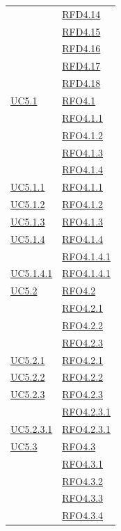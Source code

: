 \begin{longtable}{|>{\centering}m{5cm}|m{5cm}<{\centering}|}
& \hyperlink{RFD4.14}{RFD4.14}\\
& \hyperlink{RFD4.15}{RFD4.15}\\
& \hyperlink{RFD4.16}{RFD4.16}\\
& \hyperlink{RFD4.17}{RFD4.17}\\
& \hyperlink{RFD4.18}{RFD4.18}\\ \hline
\hyperref[UC5.1]{UC5.1} & \hyperlink{RFO4.1}{RFO4.1}\\
& \hyperlink{RFO4.1.1}{RFO4.1.1}\\
& \hyperlink{RFO4.1.2}{RFO4.1.2}\\
& \hyperlink{RFO4.1.3}{RFO4.1.3}\\
& \hyperlink{RFO4.1.4}{RFO4.1.4}\\ \hline
\hyperref[UC5.1.1]{UC5.1.1} & \hyperlink{RFO4.1.1}{RFO4.1.1}\\ \hline
\hyperref[UC5.1.2]{UC5.1.2} & \hyperlink{RFO4.1.2}{RFO4.1.2}\\ \hline
\hyperref[UC5.1.3]{UC5.1.3} & \hyperlink{RFO4.1.3}{RFO4.1.3}\\ \hline
\hyperref[UC5.1.4]{UC5.1.4} & \hyperlink{RFO4.1.4}{RFO4.1.4}\\
& \hyperlink{RFO4.1.4.1}{RFO4.1.4.1}\\ \hline
\hyperref[UC5.1.4.1]{UC5.1.4.1} & \hyperlink{RFO4.1.4.1}{RFO4.1.4.1}\\ \hline
\hyperref[UC5.2]{UC5.2} & \hyperlink{RFO4.2}{RFO4.2}\\
& \hyperlink{RFO4.2.1}{RFO4.2.1}\\
& \hyperlink{RFO4.2.2}{RFO4.2.2}\\
& \hyperlink{RFO4.2.3}{RFO4.2.3}\\ \hline
\hyperref[UC5.2.1]{UC5.2.1} & \hyperlink{RFO4.2.1}{RFO4.2.1}\\ \hline
\hyperref[UC5.2.2]{UC5.2.2} & \hyperlink{RFO4.2.2}{RFO4.2.2}\\ \hline
\hyperref[UC5.2.3]{UC5.2.3} & \hyperlink{RFO4.2.3}{RFO4.2.3}\\
& \hyperlink{RFO4.2.3.1}{RFO4.2.3.1}\\ \hline
\hyperref[UC5.2.3.1]{UC5.2.3.1} & \hyperlink{RFO4.2.3.1}{RFO4.2.3.1}\\ \hline
\hyperref[UC5.3]{UC5.3} & \hyperlink{RFO4.3}{RFO4.3}\\
& \hyperlink{RFO4.3.1}{RFO4.3.1}\\
& \hyperlink{RFO4.3.2}{RFO4.3.2}\\
& \hyperlink{RFO4.3.3}{RFO4.3.3}\\
& \hyperlink{RFO4.3.4}{RFO4.3.4}\\

\end{longtable}
